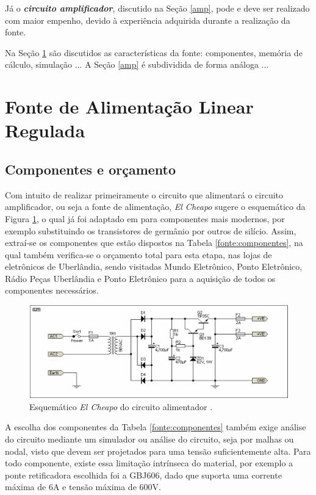 \documentclass[a4paper,12pt,oneside,openany,table,xcdraw]{article}
\begin{document}
Já o \textbf{\textit{circuito amplificador}}, discutido na Seção \ref{amp}, pode e deve ser realizado com maior empenho, devido à experiência adquirida durante a realização da fonte. 

Na Seção \ref{fonte} são discutidos as características da fonte: componentes, memória de cálculo, simulação ...
A Seção \ref{amp} é subdividida de forma análoga ... 

\newpage
\section{Fonte de Alimentação Linear Regulada} \label{fonte}

\subsection{Componentes e orçamento} 
Com intuito de realizar primeiramente o circuito que alimentará o circuito amplificador, ou seja a fonte de alimentação, \emph{El Cheapo} sugere o esquemático da Figura \ref{fonte:esquematico}, o qual já foi adaptado em \cite{cheapo} para componentes mais modernos, por exemplo substituindo os transistores de germânio por outros de silício. Assim, extraí-se os componentes que estão dispostos na Tabela \ref{fonte:componentes}, na qual também verifica-se o orçamento total para esta etapa, nas lojas de eletrônicos de Uberlândia, sendo visitadas Mundo Eletrônico, Ponto Eletrônico, Rádio Peças Uberlândia e Ponto Eletrônico para a aquisição de todos os componentes necessários.
\vspace{0.2cm}

\begin{figure}[H]
\centering
\includegraphics[width=15cm]{fonte-esquematico}
\caption{Esquemático \emph{El Cheapo} do circuito alimentador \cite{cheapo}.}
\label{fonte:esquematico}
\end{figure}
\vspace{0.4cm}

A escolha dos componentes da Tabela \ref{fonte:componentes} também exige análise do circuito mediante um simulador ou análise do circuito, seja por malhas ou nodal, visto que devem ser projetados para uma tensão suficientemente alta. Para todo componente, existe essa limitação intrínseca do material, por exemplo a ponte retificadora escolhida foi a GBJ606, dado que suporta uma corrente máxima de 6A e tensão máxima de 600V.
\end{document}
